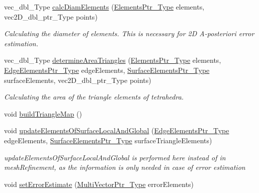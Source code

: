 \begin{DoxyCompactItemize}
vec\+\_\+dbl\+\_\+\+Type \hyperlink{classFEDD_1_1ErrorEstimation_ae2ffbe18cdcbc6b9974dd687e3cec91d}{calc\+Diam\+Elements} (\hyperlink{classFEDD_1_1ErrorEstimation_ae8e03ce6215a8a139c1c8e9d662030ce}{Elements\+Ptr\+\_\+\+Type} elements, vec2\+D\+\_\+dbl\+\_\+ptr\+\_\+\+Type points)
\begin{DoxyCompactList}\small\item\em Calculating the diameter of elements. This is necessary for 2D A-\/posteriori error estimation. \end{DoxyCompactList}\item 
vec\+\_\+dbl\+\_\+\+Type \hyperlink{classFEDD_1_1ErrorEstimation_a1623aca9e03e8e2dba9ea82ce60152cf}{determine\+Area\+Triangles} (\hyperlink{classFEDD_1_1ErrorEstimation_ae8e03ce6215a8a139c1c8e9d662030ce}{Elements\+Ptr\+\_\+\+Type} elements, \hyperlink{classFEDD_1_1ErrorEstimation_ac7ab89f64446e4c6e739058240497f04}{Edge\+Elements\+Ptr\+\_\+\+Type} edge\+Elements, \hyperlink{classFEDD_1_1ErrorEstimation_a391a95553efe67657e031e1af4ec02cc}{Surface\+Elements\+Ptr\+\_\+\+Type} surface\+Elements, vec2\+D\+\_\+dbl\+\_\+ptr\+\_\+\+Type points)
\begin{DoxyCompactList}\small\item\em Calculating the area of the triangle elements of tetrahedra. \end{DoxyCompactList}\item 
void \hyperlink{classFEDD_1_1ErrorEstimation_a7bf02e0d688631bb71d3263841dd59e0}{build\+Triangle\+Map} ()
\item 
void \hyperlink{classFEDD_1_1ErrorEstimation_ab4e45f837a9605396828ff330ac53630}{update\+Elements\+Of\+Surface\+Local\+And\+Global} (\hyperlink{classFEDD_1_1ErrorEstimation_ac7ab89f64446e4c6e739058240497f04}{Edge\+Elements\+Ptr\+\_\+\+Type} edge\+Elements, \hyperlink{classFEDD_1_1ErrorEstimation_a391a95553efe67657e031e1af4ec02cc}{Surface\+Elements\+Ptr\+\_\+\+Type} surface\+Triangle\+Elements)
\begin{DoxyCompactList}\small\item\em update\+Elements\+Of\+Surface\+Local\+And\+Global is performed here instead of in mesh\+Refinement, as the information is only needed in case of error estimation \end{DoxyCompactList}\item 
void \hyperlink{classFEDD_1_1ErrorEstimation_af4e754a90d825e98bdeb9fd66d79ae40}{set\+Error\+Estimate} (\hyperlink{classFEDD_1_1ErrorEstimation_a5882ff373bf8c409b407b4fd1f42bda0}{Multi\+Vector\+Ptr\+\_\+\+Type} error\+Elements)
\item 

\end{DoxyCompactItemize}
